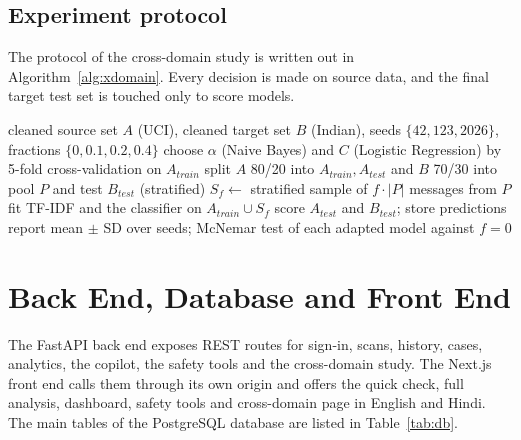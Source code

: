 \subsection{Experiment protocol}
The protocol of the cross-domain study is written out in Algorithm~\ref{alg:xdomain}. Every decision is made on source data, and the final target test set is touched only to score models.

\begin{algorithm}[H]
\caption{Cross-domain evaluation and lightweight domain adaptation}
\label{alg:xdomain}
\begin{algorithmic}[1]
\Require cleaned source set $A$ (UCI), cleaned target set $B$ (Indian), seeds $\{42, 123, 2026\}$, fractions $\{0, 0.1, 0.2, 0.4\}$
\State choose $\alpha$ (Naive Bayes) and $C$ (Logistic Regression) by 5-fold cross-validation on $A_{train}$
  \State split $A$ 80/20 into $A_{train}, A_{test}$ and $B$ 70/30 into pool $P$ and test $B_{test}$ (stratified)
    \State $S_f \gets$ stratified sample of $f\cdot|P|$ messages from $P$
    \State fit TF-IDF and the classifier on $A_{train}\cup S_f$
    \State score $A_{test}$ and $B_{test}$; store predictions
  \EndFor
\EndFor
\State report mean $\pm$ SD over seeds; McNemar test of each adapted model against $f=0$
\end{algorithmic}
\end{algorithm}

\section{Back End, Database and Front End}
The FastAPI back end exposes REST routes for sign-in, scans, history, cases, analytics, the copilot, the safety tools and the cross-domain study. The Next.js front end calls them through its own origin and offers the quick check, full analysis, dashboard, safety tools and cross-domain page in English and Hindi. The main tables of the PostgreSQL database are listed in Table~\ref{tab:db}.



